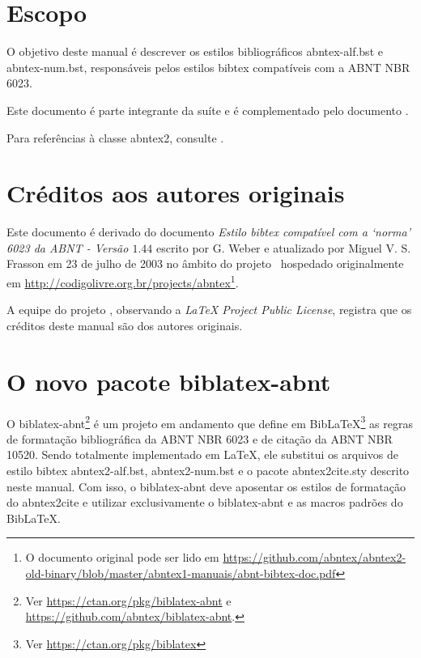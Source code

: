 \documentclass[a4paper]{ltxdoc}
\begin{document}
\tableofcontents
\listoftables

\section{Escopo}

O objetivo deste manual é descrever os estilos bibliográficos
\textsf{abntex-alf.bst} e \textsf{abntex-num.bst}, responsáveis pelos estilos
\textsf{bibtex} compatíveis com a ABNT NBR 6023. 

Este documento é parte integrante da suíte  e é complementado pelo
documento .

Para referências à classe \textsf{abntex2}, consulte .


\section{Créditos aos autores originais}

Este documento é derivado do documento \emph{Estilo bibtex compatível com a
`norma' 6023 da ABNT - Versão $ 1.44 $} escrito por G. Weber e atualizado por
Miguel V. S. Frasson em 23 de julho de 2003 no âmbito do projeto \abnTeX\
hospedado originalmente em
\url{http://codigolivre.org.br/projects/abntex}\footnote{O documento original pode ser lido em
\url{https://github.com/abntex/abntex2-old-binary/blob/master/abntex1-manuais/abnt-bibtex-doc.pdf}}.

A equipe do projeto , observando a \emph{LaTeX Project Public License},
registra que os créditos deste manual são dos autores originais.

\section{O novo pacote \textsf{biblatex-abnt}}

O \textsf{biblatex-abnt}\footnote{Ver \url{https://ctan.org/pkg/biblatex-abnt} e
\url{https://github.com/abntex/biblatex-abnt}.} \cite{biblatex-abnt} é um
projeto em andamento que define em \textsf{Bib\LaTeX}\footnote{Ver \url{https://ctan.org/pkg/biblatex}}
as regras de formatação bibliográfica da ABNT NBR 6023 e de citação da ABNT NBR
10520. Sendo totalmente implementado em \LaTeX, ele substitui os arquivos de
estilo \textsf{bibtex} \textsf{abntex2-alf.bst}, \textsf{abntex2-num.bst} e o
pacote \textsf{abntex2cite.sty} descrito neste manual. Com isso, o
\textsf{biblatex-abnt} deve aposentar os estilos de formatação do
\textsf{abntex2cite} e utilizar exclusivamente o \textsf{biblatex-abnt} e as
macros padrões do \textsf{Bib\LaTeX}.
\end{document}
